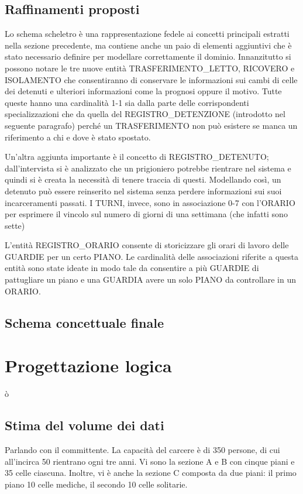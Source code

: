 \documentclass[a4paper,12pt]{report}
\begin{document}
\section{Raffinamenti proposti}
Lo schema scheletro è una rappresentazione fedele ai concetti principali estratti nella sezione precedente, ma contiene anche un paio di elementi aggiuntivi che è stato necessario definire per modellare correttamente il dominio.
%
Innanzitutto si possono notare le tre nuove entità TRASFERIMENTO\_LETTO, RICOVERO e ISOLAMENTO che consentiranno di conservare le informazioni sui cambi di celle dei detenuti e ulteriori informazioni come la prognosi oppure il motivo.
%
Tutte queste hanno una cardinalità 1-1 sia dalla parte delle corrispondenti specializzazioni che da quella del REGISTRO\_DETENZIONE (introdotto nel seguente paragrafo) perché un TRASFERIMENTO non può esistere se manca un riferimento a chi e dove è stato spostato.
%
\par
Un'altra aggiunta importante è il concetto di REGISTRO\_DETENUTO; dall'intervista si è analizzato che un prigioniero potrebbe rientrare nel sistema e quindi si è creata la necessità di tenere traccia di questi.
%
Modellando così, un detenuto può essere reinserito nel sistema senza perdere informazioni sui suoi incarceramenti passati.
%
I TURNI, invece, sono in associazione 0-7 con l'ORARIO per esprimere il vincolo sul numero di giorni di una settimana (che infatti sono sette)
%
\par
L'entità REGISTRO\_ORARIO consente di storicizzare gli orari di lavoro delle GUARDIE per un certo PIANO.
%
Le cardinalità delle associazioni riferite a questa entità sono state ideate in modo tale da consentire a più GUARDIE di pattugliare un piano e una GUARDIA avere un solo PIANO da controllare in un ORARIO.
\section{Schema concettuale finale}
\chapter{Progettazione logica}ò
\section{Stima del volume dei dati}
Parlando con il committente.
%
La capacità del carcere è di 350 persone, di cui all'incirca 50 rientrano ogni tre anni.
%
Vi sono la sezione A e B con cinque piani e 35 celle ciascuna.
%
Inoltre, vi è anche la sezione C composta da due piani: il primo piano 10 celle mediche, il secondo 10 celle solitarie.
%
\end{document}
